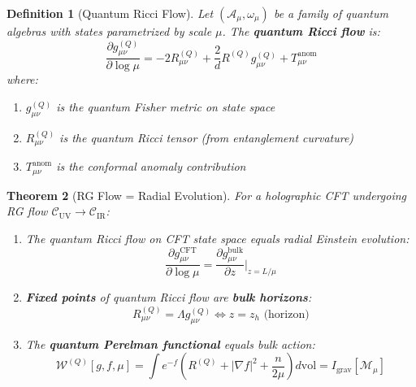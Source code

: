\documentclass[12pt,a4paper]{article}
\newtheorem{theorem}{Theorem}[section]
\newtheorem{definition}[theorem]{Definition}
\begin{document}
\begin{definition}[Quantum Ricci Flow]\label{def:quantum-ricci}
Let $(\mathcal{A}_\mu, \omega_\mu)$ be a family of quantum algebras with states parametrized by scale $\mu$. The \textbf{quantum Ricci flow} is:
\begin{equation}
\frac{\partial g_{\mu\nu}^{(Q)}}{\partial \log\mu} = -2 R_{\mu\nu}^{(Q)} + \frac{2}{d} R^{(Q)} g_{\mu\nu}^{(Q)} + T_{\mu\nu}^{\text{anom}}
\end{equation}
where:
\begin{enumerate}
    \item $g_{\mu\nu}^{(Q)}$ is the quantum Fisher metric on state space
    \item $R_{\mu\nu}^{(Q)}$ is the quantum Ricci tensor (from entanglement curvature)
    \item $T_{\mu\nu}^{\text{anom}}$ is the conformal anomaly contribution
\end{enumerate}
\end{definition}

\begin{theorem}[RG Flow = Radial Evolution]\label{thm:rg-radial}
For a holographic CFT undergoing RG flow $\mathcal{C}_{\text{UV}} \to \mathcal{C}_{\text{IR}}$:
\begin{enumerate}
    \item The quantum Ricci flow on CFT state space equals radial Einstein evolution:
    \begin{equation}
    \frac{\partial g_{\mu\nu}^{\text{CFT}}}{\partial \log\mu} = \frac{\partial g_{\mu\nu}^{\text{bulk}}}{\partial z}\bigg|_{z = L/\mu}
    \end{equation}
    
    \item \textbf{Fixed points} of quantum Ricci flow are \textbf{bulk horizons}:
    \begin{equation}
    R_{\mu\nu}^{(Q)} = \Lambda g_{\mu\nu}^{(Q)} \iff z = z_h \text{ (horizon)}
    \end{equation}
    
    \item The \textbf{quantum Perelman functional} equals bulk action:
    \begin{equation}
    \mathcal{W}^{(Q)}[g, f, \mu] = \int e^{-f}(R^{(Q)} + |\nabla f|^2 + \frac{n}{2\mu}) d\text{vol} = I_{\text{grav}}[\mathcal{M}_\mu]
    \end{equation}
\end{enumerate}
\end{theorem}
\end{document}
